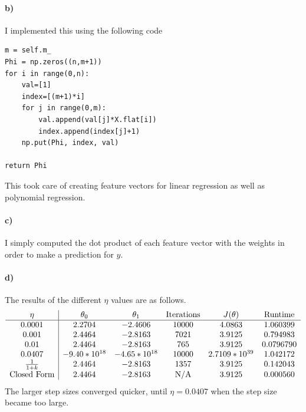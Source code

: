\documentclass[12pt]{article}
\begin{document}
\paragraph{b)}

I implemented this using the following code

\begin{verbatim}
m = self.m_
Phi = np.zeros((n,m+1))
for i in range(0,n):
    val=[1]
    index=[(m+1)*i]
    for j in range(0,m):
        val.append(val[j]*X.flat[i])
        index.append(index[j]+1)
    np.put(Phi, index, val)

return Phi
\end{verbatim}
This took care of creating feature vectors for linear regression as well as polynomial regression.

\paragraph{c)}

I simply computed the dot product of each feature vector with the weights in order to make a prediction for \(y\).

\paragraph{d)}

The results of the different \(\eta\) values are as follows.
\[
        \begin{array}{c | c c c c c}
                \eta & \theta_0 & \theta_1 & \text{Iterations} & J(\theta) & \text{Runtime}\\
                \hline
                0.0001 & 2.2704 & -2.4606 & 10000 & 4.0863 & 1.060399\\
                0.001 & 2.4464 & -2.8163 & 7021 & 3.9125 & 0.794983\\
                0.01 & 2.4464 & -2.8163 & 765 & 3.9125 & 0.0796790\\
                0.0407 & -9.40*10^{18}& -4.65*10^{18} & 10000 & 2.7109*10^{39} & 1.042172\\
                \frac{1}{1+k} & 2.4464 & -2.8163 & 1357 & 3.9125 & 0.142043\\
                \text{Closed Form} & 2.4464 & -2.8163 & \text{N/A} & 3.9125 & 0.000560\\
        \end{array}
\]
The larger step sizes converged quicker, until \(\eta=0.0407\) when the step size became too large.
\end{document}

